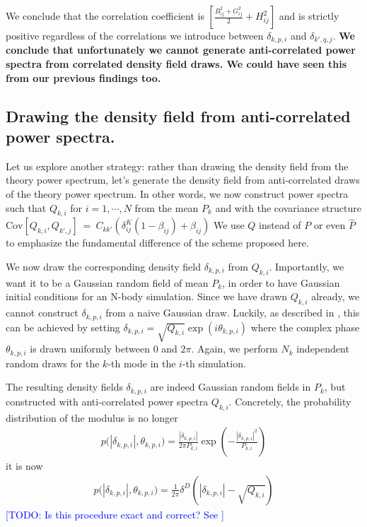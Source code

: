 \documentclass{aastex6}
\newcommand{\eqn}[1]{\begin{eqnarray}#1\end{eqnarray}}
\newcommand{\todo}[1]{\textcolor{blue}{[TODO: #1]}}
\begin{document}
 

We conclude that the correlation coefficient is $\left[  \frac{B^2_{ij} + G^2_{ij}}{2}  + H^2_{ij}\right]$ and is strictly positive regardless of the correlations we introduce between $\delta_{k, p, i}$ and $\delta_{k', q, j}$.
\textbf{We conclude that unfortunately we cannot generate anti-correlated power spectra from correlated density field draws. We could have seen this from our previous findings too.}


\subsection{Drawing the density field from anti-correlated power spectra.}


Let us explore another strategy: rather than drawing the density field from the theory power spectrum, let's generate the density field from anti-correlated draws of the theory power spectrum. 
In other words, we now construct power spectra such that $Q_{k, i}$ for $i=1, \cdots, N$ from the mean $P_{k}$ and with the covariance structure $\mathrm{Cov}[{Q}_{k, i}, {Q}_{k', j}] \ = \ C_{kk'} \left( \delta^K_{ij}(1-\beta_{ij}) + \beta_{ij} \right)$
We use $Q$ instead of $P$ or even $\hat{P}$ to emphasize the fundamental difference of the scheme proposed here.

We now draw the corresponding density field $\delta_{k, p, i}$ from $Q_{k, i}$. Importantly, we want it to be a Gaussian random field of mean $P_{k}$, in order to have Gaussian initial conditions for an N-body simulation. 
Since we have drawn $Q_{k, i}$ already, we cannot construct $\delta_{k, p, i}$ from a naive Gaussian draw.
Luckily, as described in \cite{AnguloPontzen2016}, this can be achieved by setting 
$\delta_{k, p, i} = \sqrt{Q_{k, i}} \exp(i\theta_{k, p, i})$
where the complex phase $\theta_{k, p, i}$ is drawn uniformly between $0$ and $2\pi$.
Again, we perform $N_k$ independent random draws for the $k$-th mode in the $i$-th simulation.

The resulting density fields $\delta_{k, p, i} $ are indeed Gaussian random fields in $P_k$, but constructed with anti-correlated power spectra $Q_{k, i}$.
Concretely, the probability distribution of the modulus is no longer
\eqn{
	p\bigl(|\delta_{k, p, i}|, \theta_{k, p, i}\bigr) = \frac{|\delta_{k, p, i}|}{2\pi P_{k, i}} \exp\left( -\frac{|\delta_{k, p, i}|^2}{P_{k, i}}\right)
}
it is now
\eqn{
	p\bigl(|\delta_{k, p, i}|, \theta_{k, p, i}\bigr) = \frac{1}{2\pi} \delta^D\left(|\delta_{k, p, i}| - \sqrt{Q_{k, i}}\right)
}
\todo{Is this procedure exact and correct? See \cite{AnguloPontzen2016}}
\end{document}

